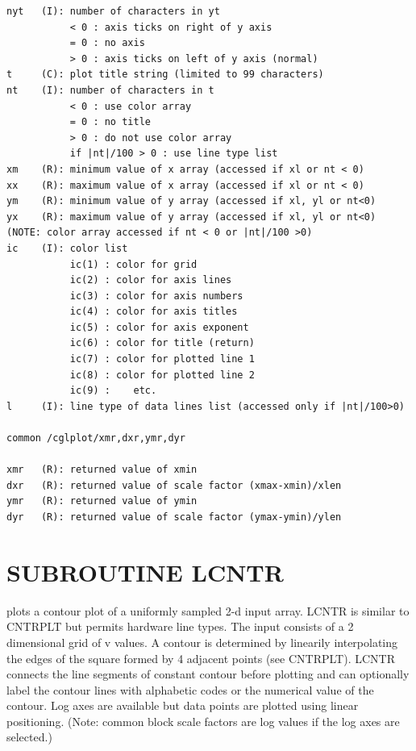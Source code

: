 \documentclass[11pt]{report}
\begin{document}
\begin{verbatim}
nyt   (I): number of characters in yt
           < 0 : axis ticks on right of y axis
           = 0 : no axis
           > 0 : axis ticks on left of y axis (normal)
t     (C): plot title string (limited to 99 characters)
nt    (I): number of characters in t
           < 0 : use color array
           = 0 : no title
           > 0 : do not use color array
           if |nt|/100 > 0 : use line type list
xm    (R): minimum value of x array (accessed if xl or nt < 0)
xx    (R): maximum value of x array (accessed if xl or nt < 0)
ym    (R): minimum value of y array (accessed if xl, yl or nt<0)
yx    (R): maximum value of y array (accessed if xl, yl or nt<0)
(NOTE: color array accessed if nt < 0 or |nt|/100 >0)
ic    (I): color list
           ic(1) : color for grid
           ic(2) : color for axis lines
           ic(3) : color for axis numbers
           ic(4) : color for axis titles
           ic(5) : color for axis exponent
           ic(6) : color for title (return)
           ic(7) : color for plotted line 1
           ic(8) : color for plotted line 2
           ic(9) :    etc.
l     (I): line type of data lines list (accessed only if |nt|/100>0)

common /cglplot/xmr,dxr,ymr,dyr

xmr   (R): returned value of xmin
dxr   (R): returned value of scale factor (xmax-xmin)/xlen
ymr   (R): returned value of ymin
dyr   (R): returned value of scale factor (ymax-ymin)/ylen
\end{verbatim}

\newpage
\section{SUBROUTINE LCNTR}

 plots a contour plot of a uniformly sampled 2-d input array.
LCNTR is similar to CNTRPLT but permits hardware line types.
The input consists of a 2 dimensional grid of v values.  A
contour is determined by linearily interpolating the edges of the square
formed by 4 adjacent points (see CNTRPLT).  LCNTR connects the line segments
of constant contour before plotting and can optionally label the contour lines
with alphabetic codes or the numerical value of the contour.
Log axes are available but data points are plotted using
linear positioning.  (Note: common block scale factors are log values
if the log axes are selected.)
\end{document}
